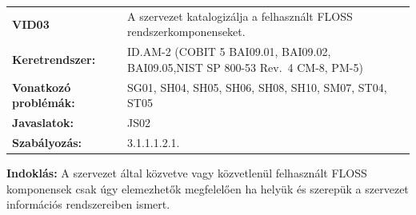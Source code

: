 \documentclass[12pt,magyar,a4paper,oneside]{scrreprt}
\begin{document}
\begin{longtable}[]{@{}ll@{}}
\toprule
\endhead
\begin{minipage}[t]{0.16\columnwidth}\raggedright
\textbf{VID03}\strut
\end{minipage} & \begin{minipage}[t]{0.79\columnwidth}\raggedright
A szervezet katalogizálja a felhasznált FLOSS
rendszerkomponenseket.\strut
\end{minipage}\tabularnewline
\begin{minipage}[t]{0.16\columnwidth}\raggedright
\textbf{Keretrendszer:}\strut
\end{minipage} & \begin{minipage}[t]{0.79\columnwidth}\raggedright
ID.AM-2 (COBIT 5 BAI09.01, BAI09.02, BAI09.05,NIST SP 800-53 Rev.~4
CM-8, PM-5)\strut
\end{minipage}\tabularnewline
\begin{minipage}[t]{0.16\columnwidth}\raggedright
\textbf{Vonatkozó problémák:}\strut
\end{minipage} & \begin{minipage}[t]{0.79\columnwidth}\raggedright
SG01, SH04, SH05, SH06, SH08, SH10, SM07, ST04, ST05\strut
\end{minipage}\tabularnewline
\begin{minipage}[t]{0.16\columnwidth}\raggedright
\textbf{Javaslatok:}\strut
\end{minipage} & \begin{minipage}[t]{0.79\columnwidth}\raggedright
JS02\strut
\end{minipage}\tabularnewline
\begin{minipage}[t]{0.16\columnwidth}\raggedright
\textbf{Szabályozás:}\strut
\end{minipage} & \begin{minipage}[t]{0.79\columnwidth}\raggedright
3.1.1.1.2.1.\strut
\end{minipage}\tabularnewline
\bottomrule
\end{longtable}

\textbf{Indoklás: } A szervezet által közvetve vagy közvetlenül
felhasznált FLOSS komponensek csak úgy elemezhetők megfelelően ha helyük
és szerepük a szervezet információs rendszereiben ismert.
\end{document}
